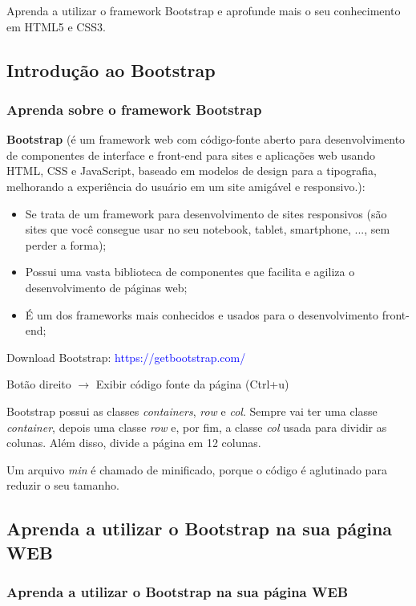 \documentclass[12pt,a4paper]{article}
\begin{document}
	Aprenda a utilizar o framework Bootstrap e aprofunde mais o seu conhecimento em HTML5 e CSS3.
	
	\subsection{Introdução ao Bootstrap}
	\subsubsection{Aprenda sobre o framework Bootstrap}
	
	\textbf{Bootstrap} (é um framework web com código-fonte aberto para desenvolvimento de componentes de interface e front-end para sites e aplicações web usando HTML, CSS e JavaScript, baseado em modelos de design para a tipografia, melhorando a experiência do usuário em um site amigável e responsivo.): 
	
	\begin{itemize}
		\item Se trata de um framework para desenvolvimento de sites responsivos (são sites que você consegue usar no seu notebook, tablet, smartphone, ..., sem perder a forma);
		\item Possui uma vasta biblioteca de componentes que facilita e agiliza o desenvolvimento de páginas web;
		\item É um dos frameworks mais conhecidos e usados para o desenvolvimento front-end;
	\end{itemize}

	Download Bootstrap: \textcolor{blue}{https://getbootstrap.com/}
	
	Botão direito $\rightarrow$ Exibir código fonte da página (Ctrl+u)
	
	Bootstrap possui as classes \textit{containers}, \textit{row} e \textit{col}. Sempre vai ter uma classe \textit{container}, depois uma classe \textit{row} e, por fim, a classe \textit{col} usada para dividir as colunas. Além disso, divide a página em 12 colunas.
	
	Um arquivo \textit{min} é chamado de minificado, porque o código é aglutinado para reduzir o seu tamanho.
	
	\subsection{Aprenda a utilizar o Bootstrap na sua página WEB}
	\subsubsection{Aprenda a utilizar o Bootstrap na sua página WEB}
	
\end{document}
